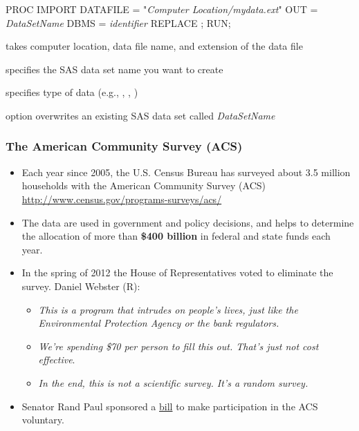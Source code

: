 \begin{frame}[fragile]
\footnotesize
\begin{code}{.0}
PROC IMPORT
   DATAFILE = "\emph{Computer Location/mydata.ext}"
   OUT = \emph{DataSetName}
   DBMS = \emph{identifier}
   REPLACE ;
RUN;
\end{code}
\emp
\vskip10pt
 \hspace{0.05in} \emp
{}
\bi
\item[\fbox{\ttt{DATAFILE=}}] takes computer location, data file name, and extension of the data file
\item[\fbox{\ttt{OUT=}}] specifies the SAS data set name you want to create
\item[\fbox{\ttt{DBMS=}}] specifies type of data (e.g., , , )
\item[\fbox{\ttt{REPLACE}}] option overwrites an existing SAS data set called \emph{DataSetName}
\ei
\emp
\end{frame}


\begin{frame}
\frametitle{The American Community Survey (ACS)}
\begin{itemize}
    \item
    Each year since 2005, the U.S. Census Bureau has surveyed about 3.5 million households with the American Community Survey (ACS) \url{http://www.census.gov/programs-surveys/acs/}
    \item
    The data are used in government and policy decisions, and helps to determine the allocation of more than \textbf{\$400 billion} in federal and state funds each year.
    \item In the spring of 2012 the House of Representatives voted to eliminate the survey.  Daniel Webster (R):
        \begin{itemize}
        \item
        \emph{This is a program that intrudes on people’s lives, just like the Environmental Protection Agency or the bank regulators.}
        \item
        \emph{We’re spending \$70 per person to fill this out. That’s just not cost effective}.
        \item
        \emph{In the end, this is not a scientific survey. It’s a random survey.}
    \end{itemize}
        \item
    Senator Rand Paul sponsored a \href{http://www.govtrack.us/congress/bills/112/s3079}{bill} to make participation in the ACS voluntary.
\end{itemize}
\end{frame}

